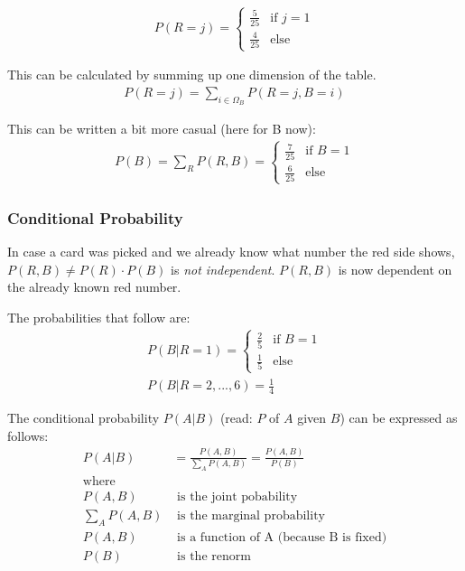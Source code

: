 \begin{align*}
P(R=j) = 
\begin{cases} 
\frac{5}{25} & \mbox{if } j = 1 \\ 
\frac{4}{25} & \mbox{else}
\end{cases}
\end{align*}

This can be calculated by summing up one dimension of the table.
\begin{align*}
P(R=j) = \sum\limits_{i \in \Omega_B} P(R=j, B=i)
\end{align*}

This can be written a bit more casual (here for B now):
\begin{align*}
P(B) = \sum\limits_R P(R, B) = 
\begin{cases} 
\frac{7}{25} & \mbox{if } B = 1 \\ 
\frac{6}{25} & \mbox{else}
\end{cases}
\end{align*}

\subsubsection*{Conditional Probability}
In case a card was picked and we already know what number the red side shows,
$P(R, B) \neq P(R) \cdot P(B)$ is \textit{not independent}. $P(R,B)$ is now dependent on the already known red number.

The probabilities that follow are:
\begin{align*}
P(B|R=1) =
\begin{cases} 
\frac{2}{5} & \mbox{if } B = 1 \\ 
\frac{1}{5} & \mbox{else}
\end{cases}\\
P(B|R=2, ..., 6) = \frac{1}{4}
\end{align*}

The conditional probability $P(A|B)$ (read: $P$ of $A$ given $B$) can be expressed as follows:
\begin{align*}
P(A|B)         &= \frac{P(A, B)}{\sum\limits_A P(A, B)} = \frac{P(A, B)}{P(B)} \\
\mbox{where}   & \\
P(A, B)        &\mbox{ is the joint pobability} \\
\sum\limits_A P(A, B) &\mbox{ is the marginal probability} \\
P(A, B)        &\mbox{ is a function of A (because B is fixed)}\\
P(B)           &\mbox{ is the renorm}
\end{align*}

